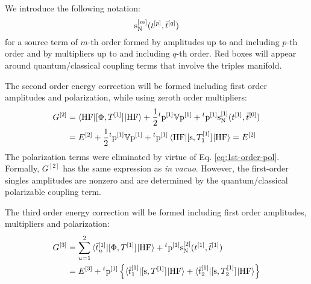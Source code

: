 We introduce the following notation:
\begin{equation}
  \mathrm{s}_{\mathrm{N}}^{[m]}(t_{}^{[p]}, \bar{t}_{}^{[q]})
\end{equation}
for a source term of $m$-th order formed by amplitudes up to and
including $p$-th order and by multipliers up to and including $q$-th order.
Red boxes will appear around quantum/classical coupling terms that
involve the triples manifold.

The second order energy correction will be formed including first order
amplitudes and polarization, while using zeroth order multipliers:
\begin{equation}\label{eq:second-order-G}
  \begin{aligned}
  G^{[2]} &=
  \braket{\mathrm{HF} | [ \Phi, T^{[1]} ]^{} | \mathrm{HF}}
  + \frac{1}{2}{}^t\mathrm{p}^{[1]}\mathbb{V}\mathrm{p}^{[1]} +
  {}^t\mathrm{p}^{[1]}\mathrm{s}_{\mathrm{N}}^{[1]}(t_{}^{[1]}, \bar{t}_{}^{[0]}) \\
  &= E^{[2]}
  +
  \frac{1}{2}{}^t\mathrm{p}^{[1]}\mathbb{V}\mathrm{p}^{[1]}
  +
  {}^t\mathrm{p}^{[1]}\braket{\mathrm{HF} | [ \mathrm{s}, T^{[1]}_1 ]^{} | \mathrm{HF}}
  = E^{[2]}
  \end{aligned}
\end{equation}
The polarization terms were eliminated by virtue of Eq.
\eqref{eq:1st-order-pol}. Formally, $G^{[2]}$ has the same expression as
\emph{in vacuo}. However, the first-order singles amplitudes are nonzero
and are determined by the quantum/classical polarizable coupling term.

The third order energy correction will be formed including first order
amplitudes, multipliers and polarization:
\begin{equation}\label{eq:third-order-G}
  \begin{aligned}
    G^{[3]} &=
    \sum_{u=1}^2\braket{\bar{t}_{u}^{[1]} | [ \Phi, T^{[1]} ]^{} | \mathrm{HF}}
    + {}^t\mathrm{p}^{[1]}\mathrm{s}_{\mathrm{N}}^{[2]}(t_{}^{[1]}, \bar{t}_{}^{[1]}) \\
    &=
    E^{[3]}
    + {}^t\mathrm{p}^{[1]}
    \left\lbrace
      \braket{\bar{t}_{1}^{[1]} | [ \mathrm{s}, T^{[1]} ]^{} | \mathrm{HF}}
    + \braket{\bar{t}_{2}^{[1]} | [ \mathrm{s}, T^{[1]}_2 ]^{} | \mathrm{HF}}
    \right\rbrace
  \end{aligned}
\end{equation}


